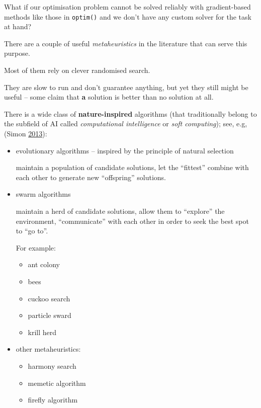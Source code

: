 \documentclass[10pt,b5paper,krantz1]{krantz}
\providecommand{\tightlist}{%
  \setlength{\itemsep}{0pt}\setlength{\parskip}{0pt}}
\renewenvironment{quote}{\begin{VF}}{\end{VF}}
\begin{document}
What if our optimisation problem cannot be solved reliably with
gradient-based methods like those in \texttt{optim()} and we don't have
any custom solver for the task at hand?

There are a couple of useful \emph{metaheuristics} in the literature
that can serve this purpose.

Most of them rely on clever randomised search.

They are slow to run and don't guarantee anything, but yet they still might be useful -- some claim that \textbf{a} solution is better than no solution at all.

There is a wide class of \textbf{nature-inspired} algorithms (that traditionally
belong to the subfield of AI called \emph{computational intelligence} or \emph{soft computing});
see, e.g, (Simon \protect\hyperlink{ref-evolution}{2013}):

\begin{itemize}
\item
  evolutionary algorithms -- inspired by the principle of natural selection

  \begin{quote}
  maintain a population of candidate solutions, let the ``fittest'' combine with each
  other to generate new ``offspring'' solutions.
  \end{quote}
\item
  swarm algorithms

  \begin{quote}
  maintain a herd of candidate solutions, allow them to ``explore'' the environment,
  ``communicate'' with each other in order to seek the best spot to ``go to''.
  \end{quote}

  For example:

  \begin{itemize}
  \tightlist
  \item
    ant colony
  \item
    bees
  \item
    cuckoo search
  \item
    particle sward
  \item
    krill herd
  \end{itemize}
\item
  other metaheuristics:

  \begin{itemize}
  \tightlist
  \item
    harmony search
  \item
    memetic algorithm
  \item
    firefly algorithm
  \end{itemize}
\end{itemize}
\end{document}
